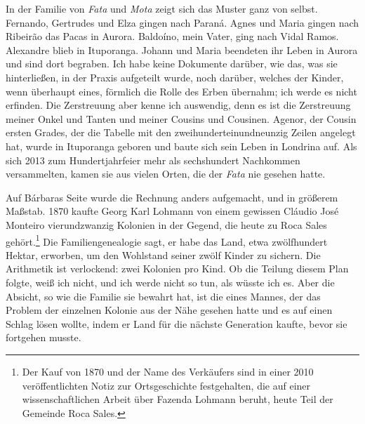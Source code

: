 \documentclass[
  ngerman,
  11pt,
  openany]{book}
\begin{document}
In der Familie von \emph{Fata} und \emph{Mota} zeigt sich das Muster
ganz von selbst. Fernando, Gertrudes und Elza gingen nach Paraná. Agnes
und Maria gingen nach Ribeirão das Pacas in Aurora. Baldoíno, mein
Vater, ging nach Vidal Ramos. Alexandre blieb in Ituporanga. Johann und
Maria beendeten ihr Leben in Aurora und sind dort begraben. Ich habe
keine Dokumente darüber, wie das, was sie hinterließen, in der Praxis
aufgeteilt wurde, noch darüber, welches der Kinder, wenn überhaupt
eines, förmlich die Rolle des Erben übernahm; ich werde es nicht
erfinden. Die Zerstreuung aber kenne ich auswendig, denn es ist die
Zerstreuung meiner Onkel und Tanten und meiner Cousins und Cousinen.
Agenor, der Cousin ersten Grades, der die Tabelle mit den
zweihunderteinundneunzig Zeilen angelegt hat, wurde in Ituporanga
geboren und baute sich sein Leben in Londrina auf. Als sich 2013 zum
Hundertjahrfeier mehr als sechshundert Nachkommen versammelten, kamen
sie aus vielen Orten, die der \emph{Fata} nie gesehen hatte.

Auf Bárbaras Seite wurde die Rechnung anders aufgemacht, und in größerem
Maßstab. 1870 kaufte Georg Karl Lohmann von einem gewissen Cláudio José
Monteiro vierundzwanzig Kolonien in der Gegend, die heute zu Roca Sales
gehört.\footnote{Der Kauf von 1870 und der Name des Verkäufers sind in
  einer 2010 veröffentlichten Notiz zur Ortsgeschichte festgehalten, die
  auf einer wissenschaftlichen Arbeit über Fazenda Lohmann beruht, heute
  Teil der Gemeinde Roca Sales.} Die Familiengenealogie sagt, er habe
das Land, etwa zwölfhundert Hektar, erworben, um den Wohlstand seiner
zwölf Kinder zu sichern. Die Arithmetik ist verlockend: zwei Kolonien
pro Kind. Ob die Teilung diesem Plan folgte, weiß ich nicht, und ich
werde nicht so tun, als wüsste ich es. Aber die Absicht, so wie die
Familie sie bewahrt hat, ist die eines Mannes, der das Problem der
einzelnen Kolonie aus der Nähe gesehen hatte und es auf einen Schlag
lösen wollte, indem er Land für die nächste Generation kaufte, bevor sie
fortgehen musste.
\end{document}
